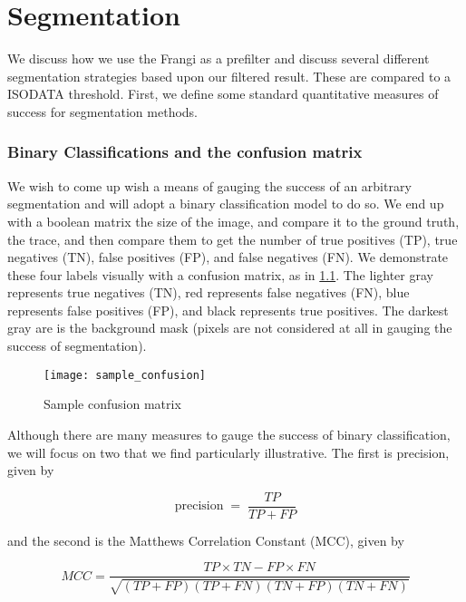 \chapter{Segmentation} \label{ch:segmentation}

We discuss how we use the Frangi as a prefilter and discuss several different segmentation strategies based upon our filtered result. These are compared to a ISODATA threshold. First, we define some standard quantitative measures of success for segmentation methods.


\subsection{Binary Classifications and the confusion matrix}

We wish to come up wish a means of gauging the success of an arbitrary segmentation and will adopt a binary classification model to do so.
We end up with a boolean matrix the size of the image, and compare it to the ground truth, the trace, and then compare them to get the number of true positives (TP), true negatives (TN), false positives (FP), and false negatives (FN). We demonstrate these four labels visually with a confusion matrix, as in \cref{fig:sample-confusion}. The lighter gray represents true negatives (TN), red represents false negatives (FN), blue represents false positives (FP), and black represents true positives. The darkest gray are is the background mask (pixels are not considered at all in gauging the success of segmentation).
 
\begin{figure}
  \centering
  \texttt{[image: sample\_confusion]}
  \caption{Sample confusion matrix}
  \label{fig:sample-confusion}
\end{figure}

Although there are many measures to gauge the success of binary classification, we will focus on two that we find particularly illustrative. The first is precision, given by

\begin{equation}
\label{eq:precision}
\textrm{precision} \;=\; \frac{TP}{TP+FP}
\end{equation}

and the second is the Matthews Correlation Constant (MCC), given by

\begin{equation} \label{eq:MCC}
MCC = \frac{TP\times TN - FP \times FN}{\sqrt{ (TP + FP)(TP+FN)(TN+FP)(TN+FN)}}
\end{equation}

